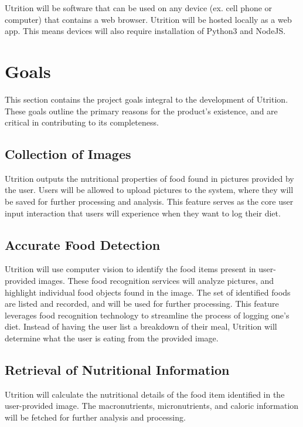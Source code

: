 \documentclass{article}
\begin{document}
Utrition will be software that can be used on any device (ex. cell phone or computer) that contains a web browser. Utrition will be hosted locally as a web app. This means devices will also require installation of Python3 and NodeJS.

\section{Goals}

This section contains the project goals integral to the development of 
Utrition. These goals outline the primary reasons for the product's existence, 
and are critical in contributing to its completeness.

\subsection{Collection of Images}

Utrition outputs the nutritional properties of food found in pictures 
provided by the user. Users will be allowed to upload pictures to the system, 
where they will be saved for further processing and analysis. This feature 
serves as the core user input interaction that users will experience when they 
want to log their diet.

\subsection{Accurate Food Detection}

Utrition will use computer vision to identify the food items present in 
user-provided images. These food recognition services will analyze pictures, 
and highlight individual food objects found in the image. The set of identified 
foods are listed and recorded, and will be used for further processing. This 
feature leverages food recognition technology to streamline the process of 
logging one's diet. Instead of having the user list a breakdown of their meal, 
Utrition will determine what the user is eating from the provided image.

\subsection{Retrieval of Nutritional Information}

Utrition will calculate the nutritional details of the food item identified in the user-provided image. The macronutrients, micronutrients, and caloric information will be fetched for further analysis and processing.
\end{document}

